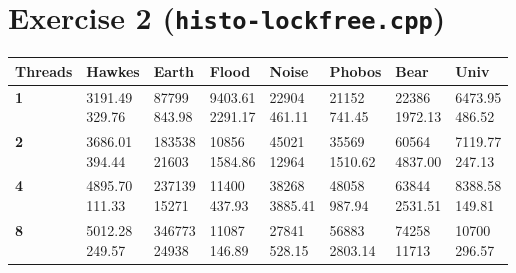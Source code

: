 \documentclass[letterpaper]{article}
\begin{document}
	\section*{Exercise 2 (\texttt{histo-lockfree.cpp})}


	\begin{center}
	\begin{tabular}{ |m{5em}|m{5em}|m{5em}|m{5em}|m{5em}|m{5em}|m{5em}|m{5em}| }
	\hline
	\textbf{Threads} & \textbf{Hawkes} & \textbf{Earth} & \textbf{Flood} & \textbf{Noise} & \textbf{Phobos} & \textbf{Bear} & \textbf{Univ} \\ \hline
	\textbf{1}& \makecell{3191.49 \\[-0.5em] 329.76}& \makecell{87799 \\[-0.5em] 843.98}& \makecell{9403.61 \\[-0.5em] 2291.17}& \makecell{22904 \\[-0.5em] 461.11}& \makecell{21152 \\[-0.5em] 741.45}& \makecell{22386 \\[-0.5em] 1972.13}& \makecell{6473.95 \\[-0.5em] 486.52}\\ \hline
	\textbf{2}& \makecell{3686.01 \\[-0.5em] 394.44}& \makecell{183538 \\[-0.5em] 21603}& \makecell{10856 \\[-0.5em] 1584.86}& \makecell{45021 \\[-0.5em] 12964}& \makecell{35569 \\[-0.5em] 1510.62}& \makecell{60564 \\[-0.5em] 4837.00}& \makecell{7119.77 \\[-0.5em] 247.13}\\ \hline
	\textbf{4}& \makecell{4895.70 \\[-0.5em] 111.33}& \makecell{237139 \\[-0.5em] 15271}& \makecell{11400 \\[-0.5em] 437.93}& \makecell{38268 \\[-0.5em] 3885.41}& \makecell{48058 \\[-0.5em] 987.94}& \makecell{63844 \\[-0.5em] 2531.51}& \makecell{8388.58 \\[-0.5em] 149.81}\\ \hline
	\textbf{8}& \makecell{5012.28 \\[-0.5em] 249.57}& \makecell{346773 \\[-0.5em] 24938}& \makecell{11087 \\[-0.5em] 146.89}& \makecell{27841 \\[-0.5em] 528.15}& \makecell{56883 \\[-0.5em] 2803.14}& \makecell{74258 \\[-0.5em] 11713}& \makecell{10700 \\[-0.5em] 296.57}\\ \hline
	\end{tabular} \end{center} 
\end{document}

